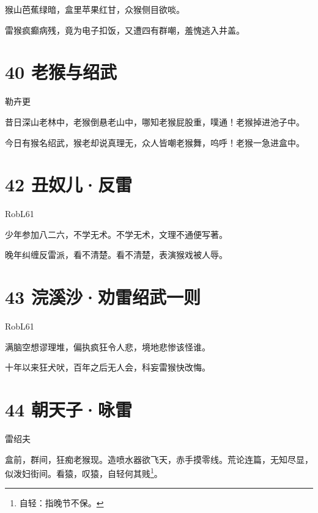\documentclass[UTF8,12pt,oneside]{ctexbook}
\begin{document}
        猴山芭蕉绿暗，盒里苹果红甘，众猴侧目欲啖。
        
        雷猴疯癫病残，竟为电子扣饭，又遭四有群嘲，羞愧逃入井盖。
        
        \section{40 老猴与绍武}
        \begin{center}
            勒卉更
        \end{center}
        
        昔日深山老林中，老猴倒悬老山中，哪知老猴屁股重，噗通！老猴掉进池子中。
        
        今日有猴名绍武，猴老却说真理无，众人皆嘲老猴舞，呜呼！老猴一急进盒中。
        
        \section{42 丑奴儿·反雷}
        \begin{center}
            RobL61
        \end{center}
        
        少年参加八二六，不学无术。不学无术，文理不通便写著。
        
        晚年纠缠反雷派，看不清楚。看不清楚，表演猴戏被人辱。
        
        \newpage
        
        \section{43 浣溪沙·劝雷绍武一则}
        \begin{center}
            RobL61
        \end{center}
        
        满脑空想谬理堆，偏执疯狂令人悲，境地悲惨该怪谁。
        
        十年以来狂犬吠，百年之后无人会，科妄雷猴快改悔。
        
        \section{44 朝天子·咏雷}
        \begin{center}
            雷绍夫
        \end{center}
        
        盒前，群间，狂痴老猴现。造喷水器欲飞天，赤手摸零线。荒论连篇，无知尽显，似泼妇街间。看猿，叹猿，自轻何其贱\footnote{自轻：指晚节不保。}。
        
\end{document}

